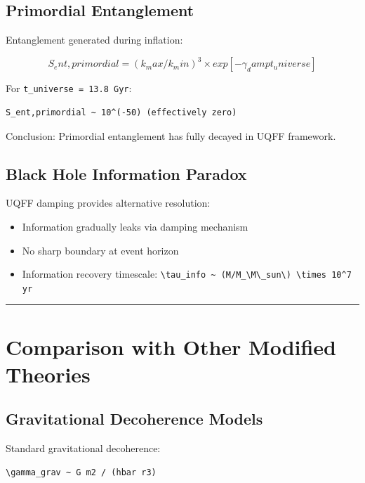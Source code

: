 \documentclass[12pt,a4paper]{article}
\begin{document}
\subsection{Primordial Entanglement}

Entanglement generated during inflation:

\begin{equation}
S_ent,primordial = (k_max/k_min)^3 \times exp[-\gamma_damp t_universe]
\end{equation}

For \texttt{t\_universe = 13.8 Gyr}:

\begin{verbatim}
S_ent,primordial ~ 10^(-50) (effectively zero)
\end{verbatim}

Conclusion: Primordial entanglement has fully decayed in UQFF framework.

\subsection{Black Hole Information Paradox}

UQFF damping provides alternative resolution:

\begin{itemize}
  \item Information gradually leaks via damping mechanism
  \item No sharp boundary at event horizon
  \item Information recovery timescale: \texttt{\textbackslash tau\_info \textasciitilde{} (M/M\_\textbackslash {M\textbackslash \_sun\textbackslash }) \textbackslash times 10\^{}7 yr}
\end{itemize}

\medskip\hrule\medskip

\section{Comparison with Other Modified Theories}

\subsection{Gravitational Decoherence Models}

Standard gravitational decoherence:

\begin{verbatim}
\gamma_grav ~ G m2 / (hbar r3)
\end{verbatim}
\end{document}
